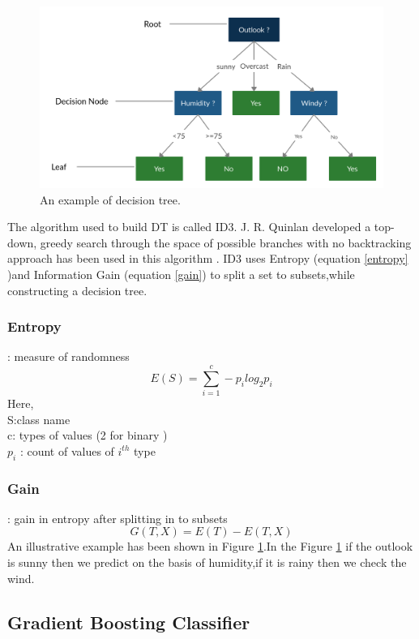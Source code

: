 \begin{figure}[ht]
    \centering
    \includegraphics[width=15cm]{Pictures/decision_tres_1.jpg}
    \caption{An example of decision tree.}
    \label{fig:decision_tree}
\end{figure}

The algorithm used to build  DT is called ID3.  J. R. Quinlan developed a top-down, greedy search through the space of possible branches with no backtracking approach has been used in this algorithm . ID3 uses Entropy (equation \ref{entropy} )and Information Gain (equation \ref{gain}) to split a set to subsets,while constructing  a decision tree.
\subsubsection{Entropy} : measure of randomness
\begin{equation}
    E(S)=\sum_{i=1}^c -p_i log_2 p_i
    \label{entropy}
\end{equation}
Here,\\
S:class name\\
c: types of values (2 for binary ) \\
$p_i$ : count of values of $i^{th}$ type\\
\subsubsection{Gain} : gain in entropy after splitting in to subsets
    \begin{equation}
        G(T,X) = E(T) - E(T,X)
        \label{gain}
    \end{equation}
An illustrative example has been shown in Figure \ref{fig:decision_tree}.In the Figure \ref{fig:decision_tree} if the outlook is sunny then we predict on the basis of  humidity,if it is rainy then we check the wind.   
\subsection{Gradient Boosting Classifier}


